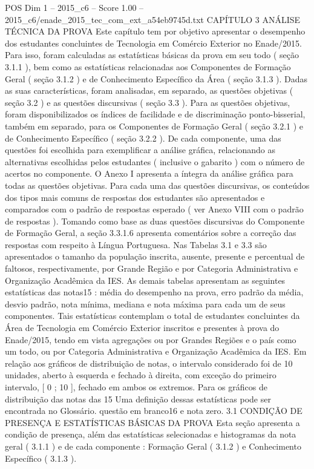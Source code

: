 \begin{textsample}{POS Dim 1 – 2015\_c6 – Score 1.00 – 2015\_c6/enade\_2015\_tec\_com\_ext\_a54eb9745d.txt}  \label{ex:f1_pos_156}
CAPÍTULO 3 ANÁLISE TÉCNICA DA PROVA Este capítulo tem por objetivo apresentar o desempenho dos estudantes concluintes de Tecnologia em Comércio Exterior no Enade/2015.
Para isso, foram calculadas as estatísticas básicas da prova em seu todo ( seção 3.1.1 ), bem como as estatísticas relacionadas aos Componentes de Formação Geral ( seção 3.1.2 ) e de Conhecimento Específico da Área ( seção 3.1.3 ).
Dadas as suas características, foram analisadas, em separado, as questões objetivas ( seção 3.2 ) e as questões discursivas ( seção 3.3 ).
Para as questões objetivas, foram disponibilizados os índices de facilidade e de discriminação ponto-bisserial, também em separado, para os Componentes de Formação Geral ( seção 3.2.1 ) e de Conhecimento Específico ( seção 3.2.2 ).
De cada componente, uma das questões foi escolhida para exemplificar a análise gráfica, relacionando as alternativas escolhidas pelos estudantes ( inclusive o gabarito ) com o número de acertos no componente.
O Anexo I apresenta a íntegra da análise gráfica para todas as questões objetivas.
Para cada uma das questões discursivas, os conteúdos dos tipos mais comuns de respostas dos estudantes são apresentados e comparados com o padrão de respostas esperado ( ver Anexo VIII com o padrão de respostas ).
Tomando como base as duas questões discursivas do Componente de Formação Geral, a seção 3.3.1.6 apresenta comentários sobre a correção das respostas com respeito à Língua Portuguesa.
Nas Tabelas 3.1 e 3.3 são apresentados o tamanho da população inscrita, ausente, presente e percentual de faltosos, respectivamente, por Grande Região e por Categoria Administrativa e Organização Acadêmica da IES.
As demais tabelas apresentam as seguintes estatísticas das notas15 : média do desempenho na prova, erro padrão da média, desvio padrão, nota mínima, mediana e nota máxima para cada um de seus componentes.
Tais estatísticas contemplam o total de estudantes concluintes da Área de Tecnologia em Comércio Exterior inscritos e presentes à prova do Enade/2015, tendo em vista agregações ou por Grandes Regiões e o país como um todo, ou por Categoria Administrativa e Organização Acadêmica da IES.
Em relação aos gráficos de distribuição de notas, o intervalo considerado foi de 10 unidades, aberto à esquerda e fechado à direita, com exceção do primeiro intervalo, [ 0 ; 10 ], fechado em ambos os extremos.
Para os gráficos de distribuição das notas das 15 Uma definição dessas estatísticas pode ser encontrada no Glossário. questão em branco16 e nota zero. 3.1 CONDIÇÃO DE PRESENÇA E ESTATÍSTICAS BÁSICAS DA PROVA Esta seção apresenta a condição de presença, além das estatísticas selecionadas e histogramas da nota geral ( 3.1.1 ) e de cada componente : Formação Geral ( 3.1.2 ) e Conhecimento Específico ( 3.1.3 ).

\end{textsample}
